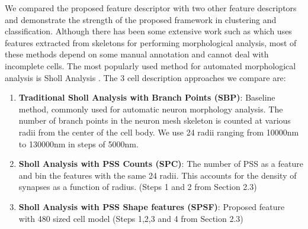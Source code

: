 \documentclass[runningheads]{llncs}
\begin{document}
We compared the proposed feature descriptor with two other feature descriptors and demonstrate the strength of the proposed framework in clustering and classification. Although there has been some extensive work such as \cite{Gouwens2019} which uses features extracted from skeletons for performing morphological analysis, most of these methods  depend on some manual annotation and cannot deal with incomplete cells. The most popularly used method for automated morphological analysis is Sholl Analysis \cite{Sholl2015}. The 3 cell description approaches we compare are:
\begin{enumerate}
    \item \textbf{Traditional Sholl Analysis with Branch Points (SBP)}: Baseline method, commonly used for automatic neuron morphology analysis. The number of branch points in the neuron mesh skeleton is counted at various radii from the center of the cell body. We use 24 radii ranging from 10000nm to 130000nm in steps of 5000nm.
    \item \textbf{Sholl Analysis with PSS Counts (SPC)}: The number of PSS as a feature and bin the features with the same 24 radii. This accounts for the density of synapses as a function of radius. (Steps 1 and 2 from Section 2.3)
    \item \textbf{Sholl Analysis with PSS Shape features (SPSF)}: Proposed feature with 480 sized cell model (Steps 1,2,3 and 4 from Section 2.3)
\end{enumerate}
\end{document}
